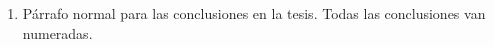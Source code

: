 
\begin{enumerate}
    \item Párrafo normal para las conclusiones en la tesis. Todas las conclusiones van numeradas.
\end{enumerate}
